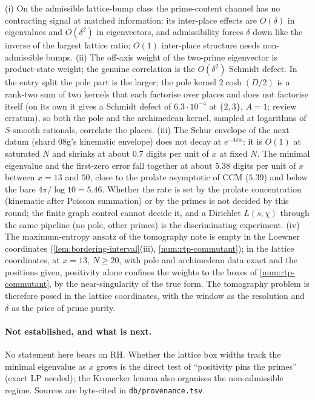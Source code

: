 \begin{observation}
\label{obs:rtp-round-1-reading}
(i) On the admissible lattice-bump class the prime-content channel has no contracting signal at matched
information: its inter-place effects are $O(\delta)$ in eigenvalues and $O(\delta^2)$ in eigenvectors, and
admissibility forces $\delta$ down like the inverse of the largest lattice ratio; $O(1)$ inter-place structure
needs non-admissible bumps. (ii) The off-axis weight of the two-prime eigenvector is product-state weight; the
genuine correlation is the $O(\delta^2)$ Schmidt defect. In the entry split the pole part is the larger;
the pole kernel $2\cosh(D/2)$ is a rank-two sum of two kernels that each factorise over places and does not
factorise itself (on its own it gives a Schmidt defect of $6.3\cdot10^{-4}$ at $\{2,3\}$, $A = 1$; review erratum),
so both the pole and the archimedean kernel, sampled at logarithms of $S$-smooth rationals, correlate the places. (iii) The Schur envelope of the next datum
(shard 08g's kinematic envelope) does not decay at $e^{-4\pi x}$: it is $O(1)$ at saturated $N$ and shrinks at
about $0.7$ digits per unit of $x$ at fixed $N$. The minimal eigenvalue and the first-zero error fall together at
about $5.38$ digits per unit of $x$ between $x = 13$ and $50$, close to the prolate asymptotic of CCM ($5.39$) and
below the bare $4\pi/\log10 = 5.46$. Whether the rate is set by the prolate concentration (kinematic after
Poisson summation) or by the primes is not decided by this round; the finite graph control cannot decide it,
and a Dirichlet $L(s,\chi)$ through the same pipeline (no pole, other primes) is the discriminating experiment.
(iv) The maximum-entropy ansatz of the tomography note is empty in the Loewner coordinates
(\cref{lem:bordering-interval}(iii), \cref{num:rtp-commutant}); in the lattice coordinates, at $x = 13$,
$N\ge20$, with pole and archimedean data exact and the positions given, positivity alone confines the weights
to the boxes of \cref{num:rtp-commutant}, by the near-singularity of the true form. The tomography problem is
therefore posed in the lattice coordinates, with the window as the resolution and $\delta$ as the price of
prime purity.
\end{observation}

\paragraph{Not established, and what is next.} No statement here bears on RH. Whether the lattice box widths track
the minimal eigenvalue as $x$ grows is the direct test of ``positivity pins the primes'' (exact LP needed); the
Kronecker lemma also organises the non-admissible regime. Sources are byte-cited in \texttt{db/provenance.tsv}.
